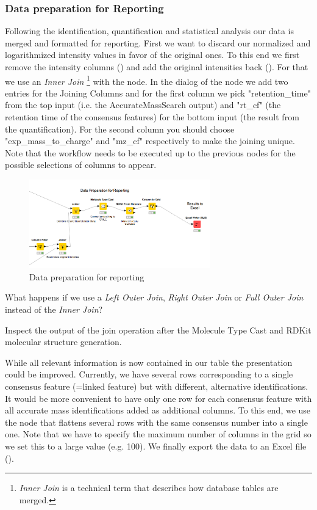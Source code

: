 \subsubsection{Data preparation for Reporting}
Following the identification, quantification and statistical analysis our data is merged and formatted for reporting.
First we want to discard our normalized and logarithmized intensity values in favor of the original ones.
To this end we first remove the intensity columns () and add the original intensities back ().
For that we use an \textit{Inner Join} \footnote{\textit{Inner Join} is a technical term that describes how database tables are merged.} with the  node. In the dialog of the node we add two entries for the Joining Columns and for the first column we pick "retention\_time" from the top input (i.e. the AccurateMassSearch output) and "rt\_cf" (the retention time of the consensus features) for the bottom input (the result from the quantification). For the second column you should choose "exp\_mass\_to\_charge" and "mz\_cf" respectively to make the joining unique. Note that the workflow needs to be executed up to the previous nodes for the possible selections of columns to appear.

\begin{figure}[htbp]
  \centering
  \includegraphics[width=0.7\textwidth]{graphics/metabo/reporting.png}
  \caption{Data preparation for reporting}
  \label{fig:reporting}
\end{figure}

\begin{question}
What happens if we use a \textit{Left Outer Join}, \textit{Right Outer Join} or \textit{Full Outer Join} instead of the \textit{Inner Join}?
\end{question}

\begin{task}
Inspect the output of the join operation after the Molecule Type Cast and RDKit molecular structure generation.
\end{task}

While all relevant information is now contained in our table the presentation could be improved.
Currently, we have several rows corresponding to a single consensus feature (=linked feature) but with different, alternative identifications.
It would be more convenient to have only one row for each consensus feature with all accurate mass identifications added as additional columns.
To this end, we use the  node that flattens several rows with the same consensus number into a single one.
Note that we have to specify the maximum number of columns in the grid so we set this to a large value (e.g. 100).
We finally export the data to an Excel file ().

